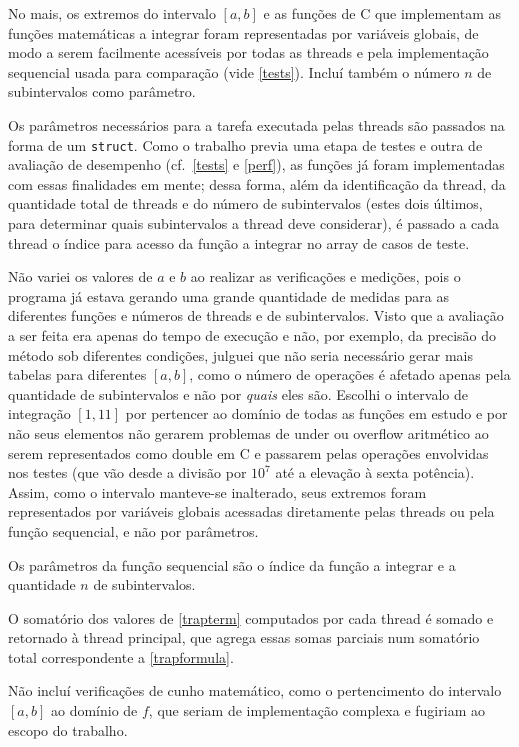\documentclass{article}
\begin{document}
  No mais, os extremos do intervalo $[a, b]$ e as funções de C que implementam as funções matemáticas a integrar foram representadas por variáveis globais, de modo a serem facilmente acessíveis por todas as threads e pela implementação sequencial usada para comparação (vide \ref{tests}). Incluí também o número $n$ de subintervalos como parâmetro.
  
  Os parâmetros necessários para a tarefa executada pelas threads são passados na forma de um \texttt{struct}. Como o trabalho previa uma etapa de testes e outra de avaliação de desempenho (cf.\ \ref{tests} e \ref{perf}), as funções já foram implementadas com essas finalidades em mente; dessa forma, além da identificação da thread, da quantidade total de threads e do número de subintervalos (estes dois últimos, para determinar quais subintervalos a thread deve considerar), é passado a cada thread o índice para acesso da função a integrar no array de casos de teste.

  Não variei os valores de $a$ e $b$ ao realizar as verificações e medições, pois o programa já estava gerando uma grande quantidade de medidas para as diferentes funções e números de threads e de subintervalos. Visto que a avaliação a ser feita era apenas do tempo de execução e não, por exemplo, da precisão do método sob diferentes condições, julguei que não seria necessário gerar mais tabelas para diferentes $[a, b]$, como o número de operações é afetado apenas pela quantidade de subintervalos e não por \emph{quais} eles são. Escolhi o intervalo de integração $[1, 11]$ por pertencer ao domínio de todas as funções em estudo e por não seus elementos não gerarem problemas de under ou overflow aritmético ao serem representados como double em C e passarem pelas operações envolvidas nos testes (que vão desde a divisão por $10^7$ até a elevação à sexta potência). Assim, como o intervalo manteve-se inalterado, seus extremos foram representados por variáveis globais acessadas diretamente pelas threads ou pela função sequencial, e não por parâmetros.

  Os parâmetros da função sequencial são o índice da função a integrar e a quantidade $n$ de subintervalos.

  O somatório dos valores de \eqref{trapterm} computados por cada thread é somado e retornado à thread principal, que agrega essas somas parciais num somatório total correspondente a \eqref{trapformula}.

  Não incluí verificações de cunho matemático, como o pertencimento do intervalo $[a, b]$ ao domínio de $f$, que seriam de implementação complexa e fugiriam ao escopo do trabalho.
\end{document}
